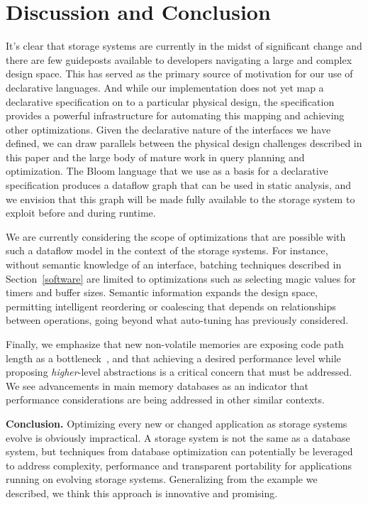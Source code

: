 \section{Discussion and Conclusion}
\label{sec:opts}

It's clear that storage systems are currently in the midst of significant
change and there are few guideposts available to developers navigating a
large and complex design space. This has served as the primary source
of motivation for our use of declarative languages. And while our
implementation does not yet map a declarative specification on to a particular
physical design, the specification provides a powerful infrastructure for
automating this mapping and achieving other optimizations.
Given the declarative nature of the interfaces we have defined, we can draw
parallels between the physical design challenges described in this paper and
the large body of mature work in query planning and optimization.  The Bloom
language that we use as a basis for a declarative specification
produces a dataflow graph that can be used in static analysis, and we
envision that this graph will be made fully available to the storage system to
exploit before and during runtime.

We are currently considering the scope of optimizations that are possible with
such a dataflow model in the context of the storage systems. For instance, without
semantic knowledge of an interface, batching techniques described in
Section~\ref{software} are limited to optimizations such as selecting magic
values for timers and buffer sizes. Semantic information expands the design
space, permitting intelligent reordering or coalescing that depends on
relationships between operations, going beyond what auto-tuning has
previously considered.

Finally, we emphasize that new non-volatile memories are exposing code path
length as a bottleneck~\cite{bottle}, and that achieving a desired performance
level while proposing \emph{higher}-level abstractions is a critical concern
that must be addressed. We see advancements in main memory databases as an
indicator that performance considerations are being addressed in other similar
contexts.

{\bf Conclusion.} Optimizing every new or changed application as storage
systems evolve is obviously impractical.  A storage system is not the same as a
database system, but techniques from database optimization can potentially be
leveraged to address complexity, performance and transparent portability for
applications running on evolving storage systems.  Generalizing from the
example we described, we think this approach is innovative and promising. 

